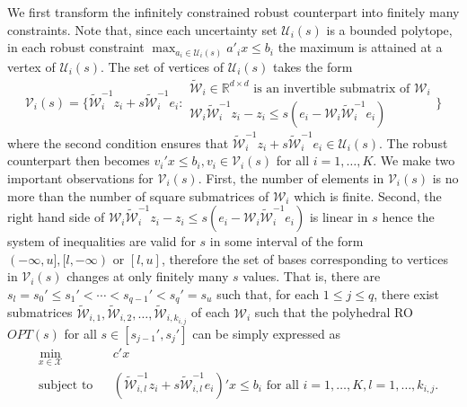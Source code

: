 \documentclass[mnsc,blindrev]{informs4} %
\newcommand{\R}{\mathbb{R}}
\begin{document}
We first transform the infinitely constrained robust counterpart into finitely many constraints. Note that, since each uncertainty set $\mathcal U_i(s)$ is a bounded polytope, in each robust constraint $\max_{a_i\in\mathcal U_i(s)}a'_ix\leq b_i$ the maximum is attained at a vertex of $\mathcal U_i(s)$. The set of vertices of $\mathcal U_i(s)$ takes the form
\begin{equation*}
    \mathcal V_i(s)=\bigg\{\widetilde{\mathcal W}_i^{-1}z_i+s\widetilde{\mathcal W}_i^{-1}e_i:
    \begin{array}{l}
         \widetilde{\mathcal W}_i\in\R^{d\times d}\text{ is an invertible submatrix of }\mathcal W_i  \\
         \mathcal W_i\widetilde{\mathcal W}_i^{-1}z_i-z_i\leq s(e_i-\mathcal W_i\widetilde{\mathcal W}_i^{-1}e_i)
    \end{array}\bigg\}
\end{equation*}
where the second condition ensures that $\widetilde{\mathcal W}_i^{-1}z_i+s\widetilde{\mathcal W}_i^{-1}e_i\in\mathcal U_i(s)$. The robust counterpart then becomes $v_i'x\leq b_i,v_i\in \mathcal V_i(s)$ for all $i=1,\ldots,K$. We make two important observations for $\mathcal V_i(s)$. First, the number of elements in $\mathcal V_i(s)$ is no more than the number of square submatrices of $\mathcal W_i$ which is finite. Second, the right hand side of $\mathcal W_i\widetilde{\mathcal W}_i^{-1}z_i-z_i\leq s(e_i-\mathcal W_i\widetilde{\mathcal W}_i^{-1}e_i)$ is linear in $s$ hence the system of inequalities are valid for $s$ in some interval of the form $(-\infty,u],[l,-\infty)$ or $[l,u]$, therefore the set of bases corresponding to vertices in $\mathcal V_i(s)$ changes at only finitely many $s$ values. That is, there are $s_l=s_0'\leq s_1'<\cdots<s_{q-1}'<s_q'= s_u$ such that, for each $1\leq j\leq q$, there exist submatrices $\widetilde{\mathcal W}_{i,1},\widetilde{\mathcal W}_{i,2},\ldots,\widetilde{\mathcal W}_{i,k_{i,j}}$ of each $\mathcal W_i$ such that the polyhedral RO $OPT(s)$ for all $s\in [s_{j-1}',s_j']$ can be simply expressed as
\begin{equation*}
\begin{aligned}
    &\min_{x\in\mathcal X}&&c'x\\
    &\text{subject to}&&(\widetilde{\mathcal W}_{i,l}^{-1}z_i+s\widetilde{\mathcal W}_{i,l}^{-1}e_i)'x\leq b_i\text{ for all }i=1,\ldots,K,l=1,\ldots,k_{i,j}.
\end{aligned}
\end{equation*}
\end{document}
